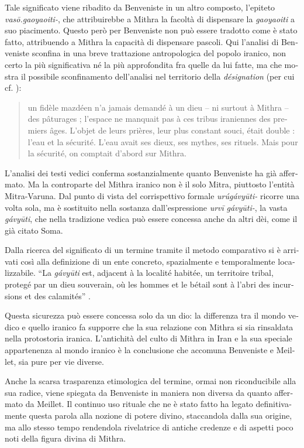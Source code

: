 \documentclass[french,output=paper,colorlinks,citecolor=brown]{../langscibook}
\begin{document}
\begin{otherlanguage}{italian}
Tale significato viene ribadito da Benveniste in un altro composto, l’epiteto \textit{vasō.gaoyaoiti-}, che attribuirebbe a Mithra la facoltà di dispensare la \textit{gaoyaoiti} a suo piacimento. Questo però per Benveniste non può essere tradotto come è stato fatto, attribuendo a Mithra la capacità di dispensare pascoli. Qui l’analisi di Benveniste sconfina in una breve trattazione antropologica del popolo iranico, non certo la più significativa né la più approfondita fra quelle da lui fatte, ma che mostra il possibile sconfinamento dell’analisi nel territorio della \textit{désignation} (per cui cf. \citealt[10]{Benveniste1969}):

\begin{quote}
    un fidèle mazdéen n’a jamais demandé à un dieu – ni surtout à Mithra – des pâturages ; l’espace ne manquait pas à ces tribus iraniennes des premiers âges. L’objet de leurs prières, leur plus constant souci, était double : l’eau et la sécurité. L’eau avait ses dieux, ses mythes, ses rituels. Mais pour la sécurité, on comptait d’abord sur Mithra. \citep[282]{Benveniste2015}
\end{quote}

L’analisi dei testi vedici conferma sostanzialmente quanto Benveniste ha già affermato. Ma la controparte del Mithra iranico non è il solo Mitra, piuttosto l’entità Mitra-Varuna. Dal punto di vista del corrispettivo formale \textit{urúgávyūti-} ricorre una volta sola, ma è sostituito nella sostanza dall'espressione \textit{urvī} \textit{gávyūti-}, la vasta \textit{gávyūti}, che nella tradizione vedica può essere concessa anche da altri dèi, come il già citato Soma.

Dalla ricerca del significato di un termine tramite il metodo comparativo si è arrivati così alla definizione di un ente concreto, spazialmente e temporalmente localizzabile. “La \textit{gávyūti} est, adjacent à la localité habitée, un territoire tribal, protegé par un dieu souverain, où les hommes et le bétail sont à l’abri des incursions et des calamités” \citep[284]{Benveniste2015}.

Questa sicurezza può essere concessa solo da un dio: la differenza tra il mondo vedico e quello iranico fa supporre che la sua relazione con Mithra si sia rinsaldata nella protostoria iranica. L’antichità del culto di Mithra in Iran e la sua speciale appartenenza al mondo iranico è la conclusione che accomuna Benveniste e Meillet, sia pure per vie diverse.

Anche la scarsa trasparenza etimologica del termine, ormai non riconducibile alla sua radice, viene spiegata da Benveniste in maniera non diversa da quanto affermato da Meillet. Il continuo uso rituale che ne è stato fatto ha legato definitivamente questa parola alla nozione di potere divino, staccandola dalla sua origine, ma allo stesso tempo rendendola rivelatrice di antiche credenze e di aspetti poco noti della figura divina di Mithra.


\end{otherlanguage}
\end{document}

